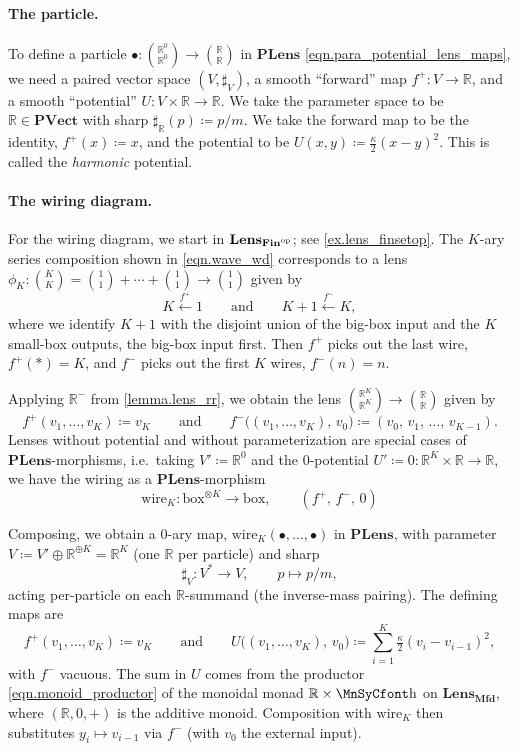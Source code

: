 \documentclass[11pt, oneside, article]{memoir}
\theoremstyle{definition}
\theoremstyle{plain}
\newcommand{\Cat}[1]{\mathbf{#1}}%
\newcommand{\fun}[1]{\mathrm{#1}}%
\newcommand{\From}[1]{\xleftarrow{#1}}
\newcommand{\op}{^\tn{op}}
\newcommand{\tn}[1]{\textnormal{#1}}
\newcommand{\rr}{\mathbb{R}}
\newcommand{\finset}{\Cat{Fin}}
\newcommand{\qqand}{\qquad\text{and}\qquad}
\newcommand{\mfd}{\Cat{Mfd}}
\newcommand{\Part}{\bullet}
\newcommand{\boxob}{\mathrm{box}}
\newcommand{\tpow}[1]{^{\otimes #1}}
\newcommand{\potlens}{\Cat{PLens}}
\newcommand{\pvect}{\Cat{PVect}}
\newcommand{\Lens}[1]{\Cat{Lens}_{#1}}
\newcommand{\inpt}[1]{#1^{-}}
\newcommand{\outp}[1]{#1^{+}}
\newcommand{\smallsquare}{\mbox{\MnSyCfont\symbol{"68}}}
\newcommand{\blank}{\mathord{\smallsquare}}
\begin{document}
\paragraph{The particle.}

To define a particle $\Part\colon\binom{\rr^0}{\rr^0}\to\binom{\rr}{\rr}$ in $\potlens$ \eqref{eqn.para_potential_lens_maps}, we need a paired vector space $(V,\sharp_V)$, a smooth ``forward'' map $\outp f\colon V\to\rr$, and a smooth ``potential'' $U\colon V\times\rr\to\rr$. We take the parameter space to be $\rr\in\pvect$ with sharp $\sharp_\rr(p)\coloneqq p/m$. We take the forward map to be the identity, $\outp f(x)\coloneqq x$, and the potential to be $U(x,y)\coloneqq\tfrac{\kappa}{2}(x-y)^2$. This is called the \emph{harmonic} potential.

\paragraph{The wiring diagram.}
For the wiring diagram, we start in $\Lens{\finset\op}$; see \cref{ex.lens_finsetop}. The $K$-ary series composition shown in \eqref{eqn.wave_wd} corresponds to a lens $\phi_K\colon\binom{K}{K}=\binom{1}{1}+\cdots+\binom{1}{1}\to\binom{1}{1}$ given by
\[
K\From{\outp f}1
\qqand
K+1\From{\inpt f} K,
\]
where we identify $K+1$ with the disjoint union of the big-box input and the $K$ small-box outputs, the big-box input first. Then $\outp f$ picks out the last wire, $\outp{f}(*)=K$, and $\inpt f$ picks out the first $K$ wires, $\inpt{f}(n)=n$.

Applying $\rr^-$ from \cref{lemma.lens_rr}, we obtain the lens $\binom{\rr^K}{\rr^K}\to\binom{\rr}{\rr}$ given by
\[
\outp f(v_1,\ldots,v_K)\coloneqq v_K
\qqand
\inpt f\bigl((v_1,\ldots,v_K),\,v_0\bigr)\coloneqq(v_0,\,v_1,\,\ldots,\,v_{K-1}).
\]
Lenses without potential and without parameterization are special cases of $\potlens$-morphisms, i.e.\ taking $V'\coloneqq\rr^0$ and the $0$-potential $U'\coloneqq0\colon\rr^K\times\rr\to\rr$, we have the wiring as a $\potlens$-morphism
\[
\fun{wire}_K\colon\boxob\tpow{K}\to\boxob,\qquad (\outp f,\,\inpt f,\,0)
\]

Composing, we obtain a $0$-ary map, $\fun{wire}_K(\Part,\ldots,\Part)$ in $\potlens$, with parameter $V\coloneqq V'\oplus\rr^{\oplus K}=\rr^K$ (one $\rr$ per particle) and sharp
\begin{equation}\label{eqn.sharp_chain}
\sharp_V\colon V^*\to V,\qquad p\mapsto p/m,
\end{equation}
acting per-particle on each $\rr$-summand (the inverse-mass pairing). The defining maps are
\[
\outp f(v_1,\ldots,v_K)\coloneqq v_K
\qqand
U\bigl((v_1,\ldots,v_K),\,v_0\bigr)\coloneqq\sum_{i=1}^{K}\tfrac{\kappa}{2}(v_i-v_{i-1})^2,
\]
with $\inpt f$ vacuous. The sum in $U$ comes from the productor \eqref{eqn.monoid_productor} of the monoidal monad $\rr\times\blank$ on $\Lens\mfd$, where $(\rr,0,+)$ is the additive monoid. Composition with $\fun{wire}_K$ then substitutes $y_i\mapsto v_{i-1}$ via $\inpt f$ (with $v_0$ the external input).
\end{document}
